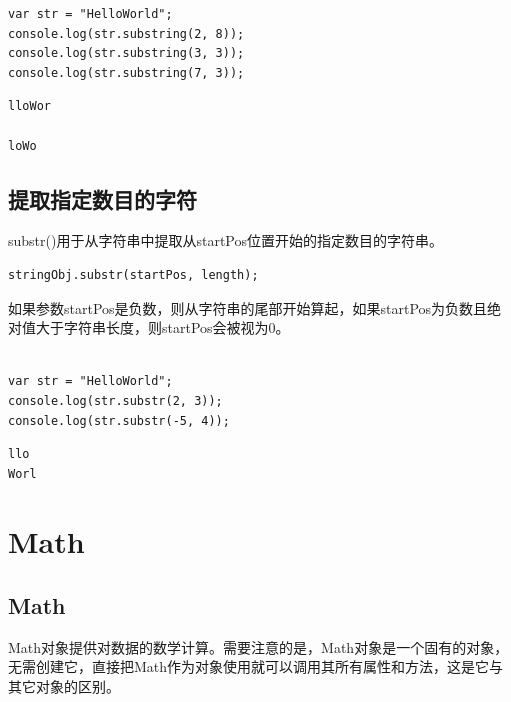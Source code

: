 \begin{lstlisting}[style=htmlcssjs]
var str = "HelloWorld";
console.log(str.substring(2, 8));
console.log(str.substring(3, 3));
console.log(str.substring(7, 3));
\end{lstlisting}

\begin{tcolorbox}
	\begin{verbatim}
lloWor

loWo
	\end{verbatim}
\end{tcolorbox}

\subsection{提取指定数目的字符}

substr()用于从字符串中提取从startPos位置开始的指定数目的字符串。 \\

\begin{lstlisting}[style=htmlcssjs]
stringObj.substr(startPos, length);
\end{lstlisting}

如果参数startPos是负数，则从字符串的尾部开始算起，如果startPos为负数且绝对值大于字符串长度，则startPos会被视为0。 \\

 \\

\begin{lstlisting}[style=htmlcssjs]
var str = "HelloWorld";
console.log(str.substr(2, 3));
console.log(str.substr(-5, 4));
\end{lstlisting}

\begin{tcolorbox}
	\begin{verbatim}
llo
Worl
	\end{verbatim}
\end{tcolorbox}

\newpage

\section{Math}

\subsection{Math}

Math对象提供对数据的数学计算。需要注意的是，Math对象是一个固有的对象，无需创建它，直接把Math作为对象使用就可以调用其所有属性和方法，这是它与其它对象的区别。

